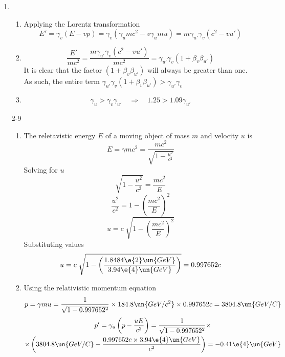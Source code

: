\documentclass{2620hw}
\begin{document}
\maketitle
	
\begin{enumerate}
	
	\item 
	\begin{enumerate}
	
	\item Applying the Lorentz transformation
	\[
		E' = \gamma_v(E - vp) = \gamma_v(\gamma_umc^2-v\gamma_umu) = m\gamma_{u'}\gamma_v(c^2-vu')
	\]
	\item 
	\[
		\frac{E'}{mc^2} =  \frac{ m\gamma_{u'}\gamma_v(c^2-vu')}{mc^2}  = \gamma_{u'}\gamma_v(1 + \beta_v\beta_{u'}) 
	\]
	It is clear that the factor $(1 + \beta_v\beta_{u'})$ will always be greater than one. As such, the entire term $\gamma_{u'}\gamma_v(1 + \beta_v\beta_{u'}) > \gamma_{u'}\gamma_v$

	\item
	\[
		\gamma_u > \gamma_v \gamma_{u'} \quad \Rightarrow \quad 1.25 > 1.09 \gamma_{u'}
	\]
	
	\end{enumerate}
	

	\item [2-9] 
	\begin{enumerate}
	\item 					
	The reletavistic energy $E$ of a moving object of mass $m$ and velocity $u$ is 
	\[
		E = \gamma mc^2 = \frac{mc^2}{ \sqrt{ 1 - \frac{u^2}{c^2}}}
	\]
	Solving for $u$
	\[
		\sqrt{ 1 - \frac{u^2}{c^2}} = \frac{mc^2}{E} 
	\]
	\[
		\frac{u^2}{c^2}  = 1 - \left( \frac{mc^2}{E} \right)^2
	\]
	\[
		u = c \; \sqrt{ 1 - \left( \frac{mc^2}{E} \right)^2}
	\]
	Substituting values
	\[
		u = c \; \sqrt{ 1 - \left( \frac{1.8484\e{2}\un{GeV}}{3.94\e{4}\un{GeV}} \right) } = 0.997652c
	\]
	
	\item Using the relativistic momentum equation
	\[
		p = \gamma mu = \frac{1}{\sqrt{1 - 0.997652^2}} \times 184.8\un{GeV/c^2} \times 0.997652c = 3804.8\un{GeV/C}
	\]
		\begin{multline*}
		p' = \gamma_u \left(p - \frac{uE}{c^2} \right) =  \frac{1}{\sqrt{ 1 - 0.997652^2}}\times\\\times \left( 3804.8\un{GeV/C} - \frac{0.997652c \times 3.94\e{4}\un{GeV}}{c^2} \right) =   -0.41\e{4}\un{GeV}
\end{multline*}	
		

\end{enumerate}
\end{enumerate}
\end{document}
